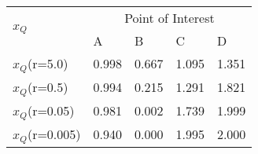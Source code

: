 \documentclass{standalone}
\newcommand{\xQ}{$x_Q$} %
\begin{document}
    \begin{table}[]
    \footnotesize
    \begin{tabular}{@{}lllll@{}}
    \toprule
    \multirow{2}{*}{\xQ} & \multicolumn{4}{c}{Point of Interest} \\ \cmidrule(l){2-5} 
     & A & B & C & D \\ \cmidrule(c){1-5}
    \xQ(r=5.0) & 0.998 & 0.667 & 1.095 & 1.351 \\
    \xQ(r=0.5) & 0.994 & 0.215 & 1.291 & 1.821 \\
    \xQ(r=0.05) & 0.981 & 0.002 & 1.739 & 1.999 \\
    \xQ(r=0.005) & 0.940 & 0.000 & 1.995 & 2.000 \\ \bottomrule
    \end{tabular}
    \end{table}
\end{document}
